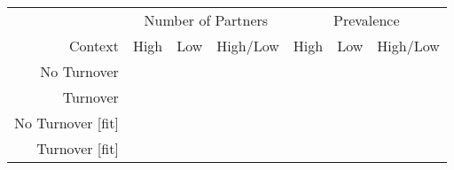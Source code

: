 \begin{tabular}{rcccccc}
  \toprule
  & \multicolumn{3}{c}{Number of Partners} & \multicolumn{3}{c}{Prevalence} \\
  \cmidrule(lr){2-4}\cmidrule(lr){5-7}
  Context & High & Low & High/Low & High & Low & High/Low \\\midrule
  No Turnover &
  
  & 
  & 
  & 
  & 
  & \textbf{}\\
  Turnover &
    
  & 
  & 
  & 
  & 
  & \textbf{}\\
  No Turnover [fit] &
    
  & 
  & \textbf{}
  & 
  & 
  & \\
  Turnover [fit] &
  
  & 
  & \textbf{}
  & 
  & 
  & \\
  \bottomrule
\end{tabular}
